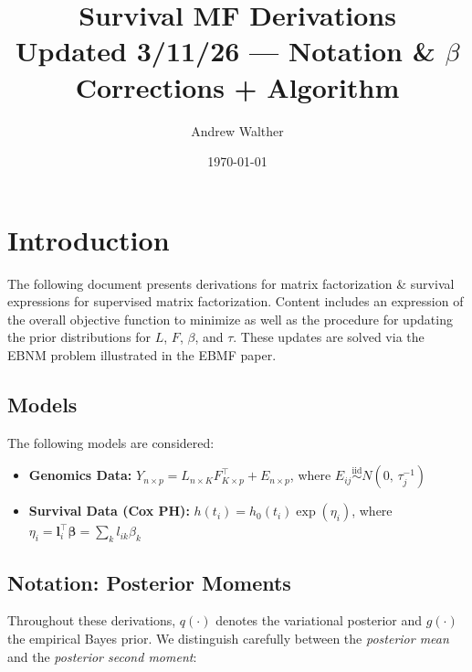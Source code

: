 \documentclass{article}[12pt]
\begin{document}
\title{Survival MF Derivations\\
\large Updated 3/11/26 --- Notation \& $\beta$ Corrections + Algorithm}
\author{Andrew Walther}
\date{\today}
\maketitle
\tableofcontents
\newpage

\section{Introduction}

The following document presents derivations for matrix factorization \& survival
expressions for supervised matrix factorization. Content includes an expression
of the overall objective function to minimize as well as the procedure for
updating the prior distributions for $L$, $F$, $\beta$, and $\tau$. These updates
are solved via the EBNM problem illustrated in the EBMF paper.

\subsection{Models}

The following models are considered:

\begin{itemize}
    \item \textbf{Genomics Data:}
    $Y_{n \times p} = L_{n\times K}F_{K\times p}^{\top} + E_{n\times p}$,
    where $E_{ij} \overset{\mathrm{iid}}{\sim} N\!\left(0,\, \tau_{j}^{-1}\right)$

    \item \textbf{Survival Data (Cox PH):}
    $h(t_i) = h_0(t_i)\exp\!\left(\eta_i\right)$,
    where $\eta_i = \bm{l}_i^{\top}\bm{\beta} = \sum_k l_{ik}\beta_{k}$
\end{itemize}

\subsection{Notation: Posterior Moments}

Throughout these derivations, $q(\cdot)$ denotes the variational posterior and
$g(\cdot)$ the empirical Bayes prior. We distinguish carefully between the
\emph{posterior mean} and the \emph{posterior second moment}:
\end{document}
